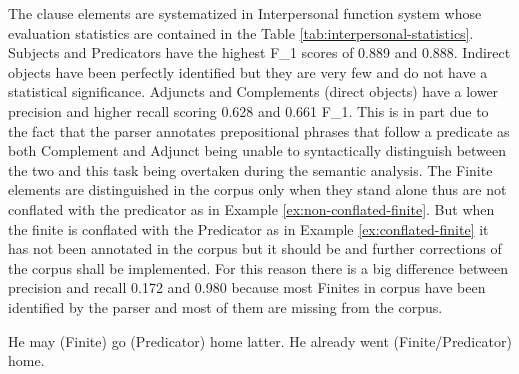 The clause elements are systematized in Interpersonal function system whose evaluation statistics are contained in the Table \ref{tab:interpersonal-statistics}. Subjects and Predicators have the highest F_{1} scores of 0.889 and 0.888. Indirect objects have been perfectly identified but they are very few and do not have a statistical significance. Adjuncts and Complements (direct objects) have a lower precision and higher recall scoring 0.628 and 0.661 F_{1}. This is in part due to the fact that the parser annotates prepositional phrases that follow a predicate as both Complement and Adjunct being unable to syntactically distinguish between the two and this task being overtaken during the semantic analysis. The Finite elements are distinguished in the corpus only when they stand alone thus are not conflated with the predicator as in Example \ref{ex:non-conflated-finite}. But when the finite is conflated with the Predicator as in Example \ref{ex:conflated-finite} it has not been annotated in the corpus but it should be and further corrections of the corpus shall be implemented. For this reason there is a big difference between precision and recall 0.172 and 0.980 because most Finites in corpus have been identified by the parser and most of them are missing from the corpus. 

\begin{exe}
    \ex \label{ex:non-conflated-finite} He may (Finite) go (Predicator) home latter.
    \ex \label{ex:conflated-finite} He already went (Finite/Predicator) home. 
\end{exe}

